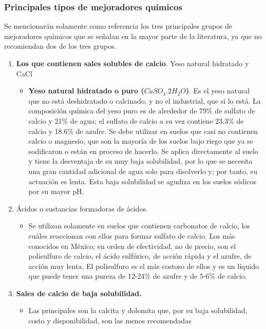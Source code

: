 \subsubsection{Principales tipos de mejoradores químicos}
Se mencionarán solamente como referencia los tres principales grupos de mejoradores químicos que se señalan en la mayor parte de la literatura, ya que no recomiendan dos de los tres grupos.
\begin{enumerate}
    \item \textbf{Los que contienen sales solubles de calcio}. Yeso natural hidratado y CaCl \begin{itemize}
        \item \textbf{Yeso natural hidratado o puro ($CaSO_4. 2H_2O$)}. Es el yeso natural que no está deshidratado o calcinado, y no el industrial, que si lo está. La composición química del yeso puro es de alrededor de 79\% de sulfato de calcio y 21\% de agua; el sulfato de calcio a su vez contiene 23.3\% de calcio y 18.6\% de azufre. Se debe utilizar en suelos que casi no contienen calcio o magnesio, que son la mayoría de los suelos bajo riego que ya se sodificaron o están en proceso de hacerlo. Se aplica directamente al suelo y tiene la desventaja de su muy baja solubilidad, por lo que se necesita una gran cantidad adicional de agua solo para disolverlo y; por tanto, su actuación es lenta. Esta baja solubilidad se agudiza en los suelos sódicos por su mayor pH.
    \end{itemize}
    \item Ácidos o sustancias formadoras de ácidos. \begin{itemize}
        \item Se utilizan solamente en suelos que contienen carbonatos de calcio, los cuáles reaccionan con ellos para formar sulfato de calcio. Los más conocidos en México; en orden de efectividad, no de precio, son el polisulfuro de calcio, el ácido sulfúrico, de acción rápida y el azufre, de acción muy lenta. El polisulfuro es el más costoso de ellos y es un líquido que puede tener una pureza de 12-24\% de azufre y de 5-6\% de calcio.
    \end{itemize}
    \item \textbf{Sales de calcio de baja solubilidad.} \begin{itemize}
        \item Las principales son la calcita y dolomita que, por su baja solubilidad, costo y disponibilidad, son las menos recomendadas
    \end{itemize}
\end{enumerate}

